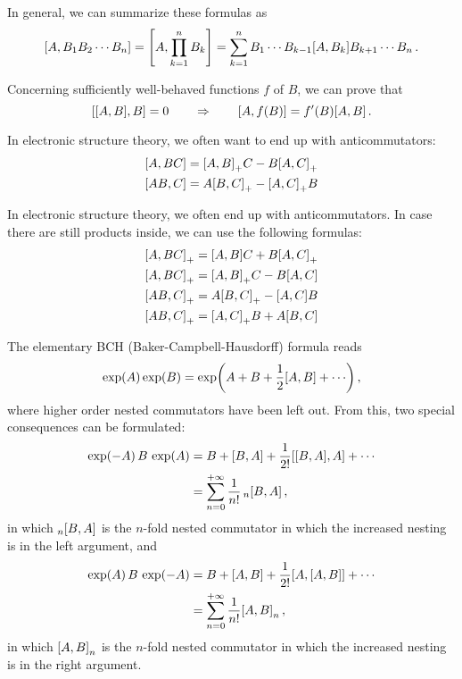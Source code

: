     In general, we can summarize these formulas as
    \begin{equation}
        \comm{A}{B_1 B_2 \cdots B_n} = \comm{A}{\prod_{k=1}^n B_k} = \sum_{k=1}^n B_1 \cdots B_{k-1} \comm{A}{B_k} B_{k+1} \cdots B_n \thinspace .
    \end{equation}

    Concerning sufficiently well-behaved functions $f$ of $B$, we can prove that
    \begin{equation}
        \comm{\comm{A}{B}}{B} = 0 \qquad\Rightarrow\qquad \comm{A}{f(B)} = f'(B) \comm{A}{B} \thinspace .
    \end{equation}

    In electronic structure theory, we often want to end up with anticommutators:
    \begin{align}
        & \comm{A}{BC} = \comm{A}{B}_+ C - B \comm{A}{C}_+ \\
        & \comm{AB}{C} = A \comm{B}{C}_+ - \comm{A}{C}_+ B
    \end{align}

    In electronic structure theory, we often end up with anticommutators. In case there are still products inside, we can use the following formulas:
    \begin{align}
        & \comm{A}{BC}_+ = \comm{A}{B} C + B \comm{A}{C}_+ \\
        & \comm{A}{BC}_+ = \comm{A}{B}_+ C - B \comm{A}{C} \\
        & \comm{AB}{C}_+ = A \comm{B}{C}_+ - \comm{A}{C} B \\
        & \comm{AB}{C}_+ = \comm{A}{C}_+ B + A \comm{B}{C}
    \end{align}

    The elementary BCH (Baker-Campbell-Hausdorff) formula reads
    \begin{equation}
        \exp(A) \exp(B) = \exp(A + B + \frac{1}{2} \comm{A}{B} + \cdots) \thinspace ,
    \end{equation}
    where higher order nested commutators have been left out. From this, two special consequences can be formulated:
    \begin{align}
        \exp(-A) \thinspace B \thinspace \exp(A) &= B + \comm{B}{A} + \frac{1}{2!} \comm{\comm{B}{A}}{A} + \cdots \\
        &= \sum_{n=0}^{+ \infty} \frac{1}{n!} \thinspace {}_n\comm{B}{A} \thinspace ,
    \end{align}
    in which ${}_n\comm{B}{A}$ is the $n$-fold nested commutator in which the increased nesting is in the left argument, and
    \begin{align}
        \exp(A) \thinspace B \thinspace \exp(-A) &= B + \comm{A}{B} + \frac{1}{2!} \comm{A}{\comm{A}{B}} + \cdots \\
        &= \sum_{n=0}^{+ \infty} \frac{1}{n!} \comm{A}{B}_n \thinspace ,
    \end{align}
    in which $\comm{A}{B}_n$ is the $n$-fold nested commutator in which the increased nesting is in the right argument.
